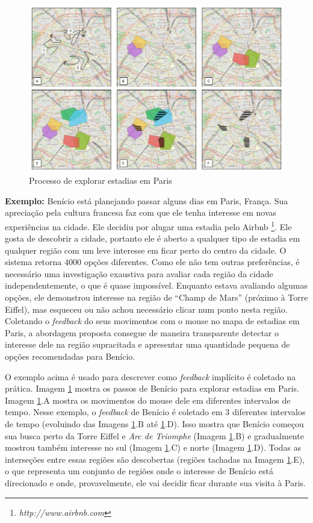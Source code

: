 \begin{figure}[t]
	\caption{Processo de explorar estadias em Paris}
	\label{fig:regions}
	\centering
	\includegraphics[width=\textwidth]{imagens/caso-de-estudo}
	\mfonte
\end{figure}

\textbf{Exemplo:} Benício está planejando passar alguns dias em Paris, França. Sua apreciação pela cultura francesa faz com que ele tenha interesse em novas experiências na cidade. Ele decidiu por alugar uma estadia pelo Airbnb \footnote{\em http://www.airbnb.com}. Ele gosta de descobrir a cidade, portanto ele é aberto a qualquer tipo de estadia em qualquer região com um leve interesse em ficar perto do centro da cidade. O sistema retorna $4000$ opções diferentes. Como ele não tem outras preferências, é necessário uma investigação exaustiva para avaliar cada região da cidade independentemente, o que é quase impossível. Enquanto estava avaliando algumas opções, ele demonstrou interesse na região de  ``Champ de Mars'' (próximo à Torre Eiffel), mas esqueceu ou não achou necessário clicar num ponto nesta região. Coletando o {\em feedback} do seus movimentos com o mouse no mapa de estadias em Paris, a abordagem proposta consegue de maneira transparente detectar o interesse dele na região supracitada e apresentar uma quantidade pequena de opções recomendadas para Benício.

O exemplo acima é usado para descrever como {\em feedback} implícito é coletado na prática. Imagem \ref{fig:regions} mostra os passos de Benício para explorar estadias em Paris. Imagem \ref{fig:regions}.A mostra os movimentos do mouse dele em diferentes intervalos de tempo. Nesse exemplo, o {\em feedback} de Benício é coletado em 3 diferentes intervalos de tempo (evoluindo das Imagens \ref{fig:regions}.B até \ref{fig:regions}.D). Isso mostra que Benício começou sua busca perto da Torre Eiffel e {\em Arc de Triomphe} (Imagem \ref{fig:regions}.B) e gradualmente mostrou também interesse no sul (Imagem \ref{fig:regions}.C) e norte (Imagem \ref{fig:regions}.D). Todas as interseções entre essas regiões são descobertas (regiões tachadas na Imagem \ref{fig:regions}.E), o que representa um conjunto de regiões onde o interesse de Benício está direcionado e onde, provavelmente, ele vai decidir ficar durante sua visita à Paris.

